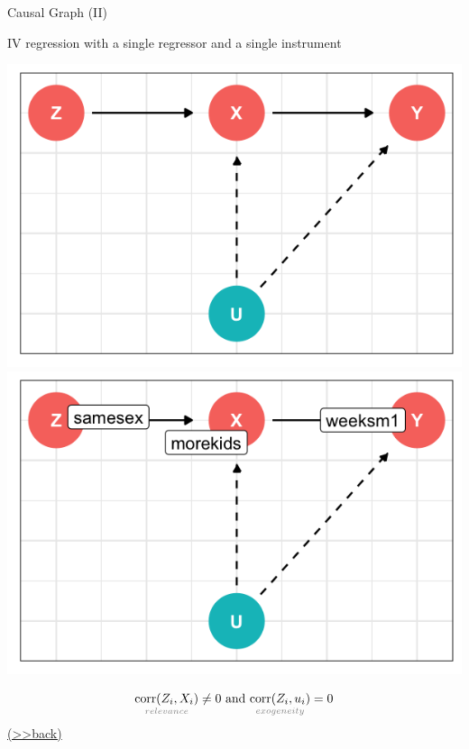 \documentclass[
  10pt,
  ignorenonframetext,
]{beamer}
\begin{document}
\begin{frame}{Causal Graph (II)}
\protect\hypertarget{IVCG}{}
\begin{block}{IV regression with a single regressor and a single
instrument}
\protect\hypertarget{iv-regression-with-a-single-regressor-and-a-single-instrument-1}{}
\begin{center}\includegraphics[width=0.48\linewidth,height=0.4\textheight]{pictures/IVsetting1} \includegraphics[width=0.48\linewidth,height=0.4\textheight]{pictures/IVsetting2} \end{center}

\[
\underset{\color{gray}{relevance}}{\text{corr}(Z_i, X_i)} \neq 0 \text{ and } \underset{\color{gray}{exogeneity}}{\text{corr}(Z_i, u_i)}  = 0
\] \footnotesize\protect\hyperlink{IVQ}{(\textgreater\textgreater back)}
\normalsize
\end{block}
\end{frame}
\end{document}
